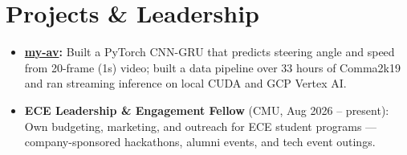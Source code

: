 \documentclass[11pt, letterpaper]{article}
\begin{document}
\section{Projects \& Leadership}
\begin{itemize}
  \item \textbf{\href{https://github.com/lordphone/my-av}{my-av}:} Built a PyTorch CNN-GRU that predicts steering angle and speed from 20-frame (1s) video; built a data pipeline over 33 hours of Comma2k19 and ran streaming inference on local CUDA and GCP Vertex AI.
  \item \textbf{ECE Leadership \& Engagement Fellow} (CMU, Aug 2026 -- present): Own budgeting, marketing, and outreach for ECE student programs --- company-sponsored hackathons, alumni events, and tech event outings.
\end{itemize}
\end{document}
